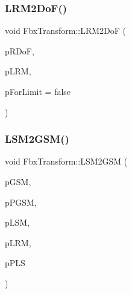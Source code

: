\mbox{\label{class_fbx_transform_abce0f74a057f18e9f28b605249f15f44}} 
\subsubsection{\texorpdfstring{L\+R\+M2\+Do\+F()}{LRM2DoF()}}
{\footnotesize\ttfamily void Fbx\+Transform\+::\+L\+R\+M2\+DoF (\begin{DoxyParamCaption}\item[{\hyperlink{class_fbx_vector4}{Fbx\+Vector4} \&}]{p\+R\+DoF,  }\item[{const \hyperlink{class_fbx_a_matrix}{Fbx\+A\+Matrix} \&}]{p\+L\+RM,  }\item[{bool}]{p\+For\+Limit = {\ttfamily false} }\end{DoxyParamCaption})}

\mbox{\label{class_fbx_transform_a152f85edfff375ffe59e27cbbd41c137}} 
\subsubsection{\texorpdfstring{L\+S\+M2\+G\+S\+M()}{LSM2GSM()}}
{\footnotesize\ttfamily void Fbx\+Transform\+::\+L\+S\+M2\+G\+SM (\begin{DoxyParamCaption}\item[{\hyperlink{class_fbx_a_matrix}{Fbx\+A\+Matrix} \&}]{p\+G\+SM,  }\item[{const \hyperlink{class_fbx_a_matrix}{Fbx\+A\+Matrix} \&}]{p\+P\+G\+SM,  }\item[{const \hyperlink{class_fbx_a_matrix}{Fbx\+A\+Matrix} \&}]{p\+L\+SM,  }\item[{const \hyperlink{class_fbx_a_matrix}{Fbx\+A\+Matrix} \&}]{p\+L\+RM,  }\item[{const \hyperlink{class_fbx_vector4}{Fbx\+Vector4} \&}]{p\+P\+LS }\end{DoxyParamCaption})}

\mbox{\label{class_fbx_transform_ae650285f1c785fc88abd2937e6dd1882}} 
